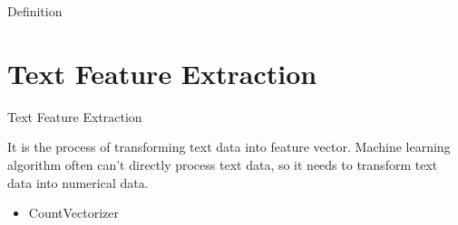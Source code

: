 \documentclass[
 size=12pt,
 paper=smartboard, %
 mode=present, %
 display=slides, %
style=tuliplab,
pauseslide,
fleqn,leqno]{powerdot}
\begin{document}
\begin{slide}{Definition}

\section{Text Feature Extraction}

\begin{slide}[toc=,bm=]{Text Feature Extraction}

  It is the process of transforming text data into feature vector. Machine learning algorithm often can't directly process text data, so it needs to transform text data into numerical data.
  \begin{itemize}
  \item CountVectorizer \ 


\end{itemize}
\end{slide}
\end{slide}
\end{document}
